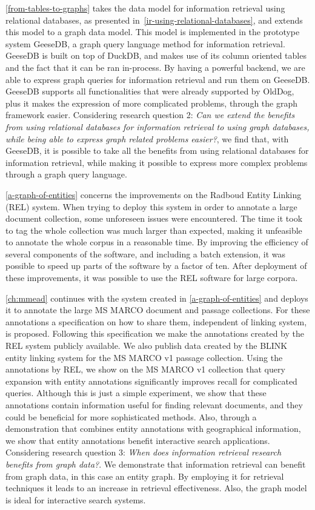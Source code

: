 \cref{from-tables-to-graphs} takes the data model for information retrieval using relational databases, as presented in~\cref{ir-using-relational-databases}, and extends this model to a graph data model. This model is implemented in the prototype system GeeseDB, a graph query language method for information retrieval. GeeseDB is built on top of DuckDB, and makes use of its column oriented tables and the fact that it can be ran in-process. By having a powerful backend, we are able to express graph queries for information retrieval and run them on GeeseDB. GeeseDB supports all functionalities that were already supported by OldDog, plus it makes the expression of more complicated problems, through the graph framework easier. Considering research question 2: \emph{Can we extend the benefits from using relational databases for information retrieval to using graph databases, while being able to express graph related problems easier?}, we find that, with GeeseDB, it is possible to take all the benefits from using relational databases for information retrieval, while making it possible to express more complex problems through a graph query language.

\cref{a-graph-of-entities} concerns the improvements on the Radboud Entity Linking (REL) system. When trying to deploy this system in order to annotate a large document collection, some unforeseen issues were encountered. The time it took to tag the whole collection was much larger than expected, making it unfeasible to annotate the whole corpus in a reasonable time. By improving the efficiency of several components of the software, and including a batch extension, it was possible to speed up parts of the software by a factor of ten. After deployment of these improvements, it was possible to use the REL software for large corpora. 

\cref{ch:mmead} continues with the system created in \cref{a-graph-of-entities} and deploys it to annotate the large MS MARCO document and passage collections. For these annotations a specification on how to share them, independent of linking system, is proposed. Following this specification we make the annotations created by the REL system publicly available. We also publish data created by the BLINK entity linking system for the MS MARCO v1 passage collection. Using the annotations by REL, we show on the MS MARCO v1 collection that query expansion with entity annotations significantly improves recall for complicated queries. Although this is just a simple experiment, we show that these annotations contain information useful for finding relevant documents, and they could be beneficial for more sophisticated methods. Also, through a demonstration that combines entity annotations with geographical information, we show that entity annotations benefit interactive search applications. Considering research question 3: \emph{When does information retrieval research benefits from graph data?}. We demonstrate that information retrieval can benefit from graph data, in this case an entity graph. By employing it for retrieval techniques it leads to an increase in retrieval effectiveness. Also, the graph model is ideal for interactive search systems. 

